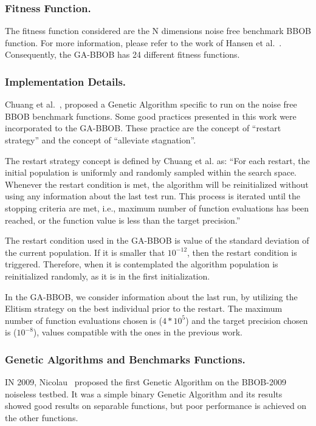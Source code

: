 \subsubsection*{Fitness Function.}
The fitness function considered are the N dimensions noise free benchmark BBOB function. For more information, please refer to the work of Hansen et al.~\cite{hansen2010real}.
Consequently, the GA-BBOB has 24 different fitness functions. 


\subsubsection*{Implementation Details.}
Chuang et al.~\cite{chuang2012black}, proposed a Genetic Algorithm specific to run on the noise free BBOB benchmark functions. Some good practices presented in this work were incorporated to the GA-BBOB. These practice are the concept of ``restart strategy'' and the concept of ``alleviate stagnation''.

The restart strategy concept is defined by Chuang et al. as: ``For each restart, the initial population  is uniformly and randomly sampled within the search space. Whenever the restart condition is met, the algorithm will be reinitialized without using any information about the last test run. This process is iterated until the stopping criteria are met, i.e., maximum number of function evaluations has been reached, or the function value is less than the target precision.''

The restart condition used in the GA-BBOB is value of the standard deviation of the current population. If it is smaller that $10^{-12}$, then the restart condition is triggered. Therefore, when it is contemplated the algorithm population is reinitialized randomly, as it is in the first initialization. 

In the GA-BBOB, we consider information about the last run, by utilizing the Elitism strategy on the best individual prior to the restart. The maximum number of function evaluations chosen is ($4 * 10^5$) and the target precision chosen is ($10^{-8}$), values compatible with the ones in the previous work.

\subsubsection*{Genetic Algorithms and Benchmarks Functions.}

IN 2009, Nicolau~\cite{nicolau2009application} proposed the first Genetic Algorithm on the BBOB-2009 noiseless testbed. It was a simple binary Genetic Algorithm and its results showed good results on separable functions, but poor performance is achieved on the other functions.


